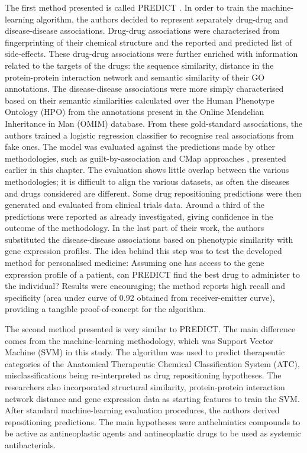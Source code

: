 The first method presented is called PREDICT \citep{gottlieb2011predict}. In order to train the machine-learning algorithm, the authors decided to represent separately drug-drug and disease-disease associations. Drug-drug associations were characterised from fingerprinting of their chemical structure and the reported and predicted list of side-effects. These drug-drug associations were further enriched with information related to the targets of the drugs: the sequence similarity, distance in the protein-protein interaction network and semantic similarity of their GO annotations. The disease-disease associations were more simply characterised based on their semantic similarities calculated over the Human Phenotype Ontology (HPO) from the annotations present in the Online Mendelian Inheritance in Man (OMIM) database. From these gold-standard associations, the authors trained a logistic regression classifier to recognise real associations from fake ones. The model was evaluated against the predictions made by other methodologies, such as guilt-by-association and CMap approaches \citep{lamb2006connectivity}, presented earlier in this chapter. The evaluation shows little overlap between the various methodologies; it is difficult to align the various datasets, as often the diseases and drugs considered are different. Some drug repositioning predictions were then generated and evaluated from clinical trials data. Around a third of the predictions were reported as already investigated, giving confidence in the outcome of the methodology. In the last part of their work, the authors substituted the disease-disease associations based on phenotypic similarity with gene expression profiles. The idea behind this step was to test the developed method for personalised medicine: Assuming one has access to the gene expression profile of a patient, can PREDICT find the best drug to administer to the individual? Results were encouraging; the method reports high recall and specificity (area under curve of 0.92 obtained from receiver-emitter curve), providing a tangible proof-of-concept for the algorithm.

The second method presented \citep{napolitano2013drug} is very similar to PREDICT. The main difference comes from the machine-learning methodology, which was Support Vector Machine (SVM) in this study. The algorithm was used to predict therapeutic categories of the Anatomical Therapeutic Chemical Classification System (ATC), misclassifications being re-interpreted as drug repositioning hypotheses. The researchers also incorporated structural similarity, protein-protein interaction network distance and gene expression data as starting features to train the SVM. After standard machine-learning evaluation procedures, the authors derived repositioning predictions. The main hypotheses were anthelmintics compounds to be active as antineoplastic agents and antineoplastic drugs to be used as systemic antibacterials.

